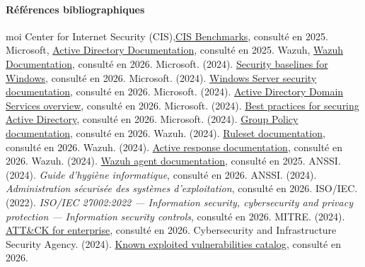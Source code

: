 \documentclass[a4paper, 11pt]{article}
\begin{document}
\paragraph*{Références bibliographiques}
 \begin{thebibliography}{moi}
\bibitem{[3]} Center for Internet Security (CIS),\href{https://www.cisecurity.org/cis-benchmarks/}{CIS Benchmarks}, consulté en 2025.
\bibitem{[4]} Microsoft, \href{https://docs.microsoft.com/en-us/windows-server/identity/active-directory-domain-services}{Active Directory Documentation}, consulté en 2025.
\bibitem{[5]} Wazuh, \href{https://documentation.wazuh.com/}{Wazuh Documentation}, consulté en 2026.
\bibitem{[11]} Microsoft. (2024). \href{https://learn.microsoft.com/en-us/windows/security/threat-protection/windows-security-configuration-framework/security-baselines}{Security baselines for Windows}, consulté en 2026.
\bibitem{[12]} Microsoft. (2024). \href{https://learn.microsoft.com/en-us/windows-server/security/}{Windows Server security documentation}, consulté en 2026.
\bibitem{[13]} Microsoft. (2024). \href{https://learn.microsoft.com/en-us/windows-server/identity/ad-ds/get-started/virtual-dc/active-directory-domain-services-overview}{Active Directory Domain Services overview}, consulté en 2026.
\bibitem{[14]} Microsoft. (2024). \href{https://learn.microsoft.com/en-us/windows-server/identity/ad-ds/plan/security-best-practices/active-directory-security-best-practices}{Best practices for securing Active Directory}, consulté en 2026.
\bibitem{[15]} Microsoft. (2024). \href{https://learn.microsoft.com/en-us/windows-server/administration/windows-commands/group-policy-objects}{Group Policy documentation}, consulté en 2026.
\bibitem{[19]} Wazuh. (2024). \href{https://documentation.wazuh.com/current/user-manual/ruleset/index.html}{Ruleset documentation}, consulté en 2026.
\bibitem{[20]} Wazuh. (2024). \href{https://documentation.wazuh.com/current/user-manual/capabilities/active-response/index.html}{Active response documentation}, consulté en 2026.
\bibitem{[21]} Wazuh. (2024). \href{https://documentation.wazuh.com/current/user-manual/agents/index.html}{Wazuh agent documentation}, consulté en 2025.
\bibitem{[22]} ANSSI. (2024). \textit{Guide d’hygiène informatique}, consulté en 2026.
\bibitem{[23]} ANSSI. (2024). \textit{Administration sécurisée des systèmes d’exploitation}, consulté en 2026.
\bibitem{[27]} ISO/IEC. (2022). \textit{ISO/IEC 27002:2022 — Information security, cybersecurity and privacy protection — Information security controls}, consulté en 2026.
\bibitem{[28]} MITRE. (2024). \href{https://attack.mitre.org/}{ATT\&CK for enterprise}, consulté en 2026.
\bibitem{[29]} Cybersecurity and Infrastructure Security Agency. (2024). \href{https://www.cisa.gov/known-exploited-vulnerabilities-catalog}{Known exploited vulnerabilities catalog}, consulté en 2026.
\end{thebibliography}
\end{document}
